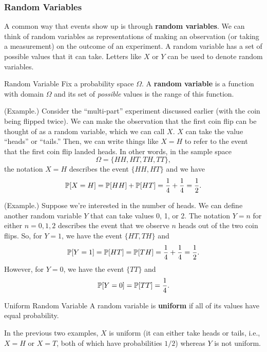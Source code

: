\documentclass[letterpaper]{article}
\newcommand{\0}{\mathbf{0}}
\begin{document}
\subsubsection{Random Variables}
A common way that events show up is through \textbf{random variables}. We can think of random variables as representations of making an observation (or taking a measurement) on the outcome of an experiment. A random variable has a set of possible values that it can take. Letters like $X$ or $Y$ can be used to denote random variables. 
\begin{definition}{Random Variable}{}
    Fix a probability space $\Omega$. A \textbf{random variable} is a function with domain $\Omega$ and its set of \emph{possible} values is the range of this function. 
\end{definition}

\begin{mdframed}
    (Example.) Consider the ``multi-part'' experiment discussed earlier (with the coin being flipped twice). We can make the observation that the first coin flip can be thought of as a random variable, which we can call $X$. $X$ can take the value ``heads'' or ``tails.'' Then, we can write things like $X = H$ to refer to the event that the first coin flip landed heads. In other words, in the sample space \[\Omega = \{HH, HT, TH, TT\},\] the notation $X = H$ describes the event $\{HH, HT\}$ and we have \[\mathbb{P}[X = H] = \mathbb{P}[HH] + \mathbb{P}[HT] = \frac{1}{4} + \frac{1}{4} = \frac{1}{2}.\]
\end{mdframed}

\begin{mdframed}
    (Example.) Suppose we're interested in the number of heads. We can define another random variable $Y$ that can take values 0, 1, or 2. The notation $Y = n$ for either $n = 0, 1, 2$ describes the event that we observe $n$ heads out of the two coin flips. So, for $Y = 1$, we have the event $\{HT, TH\}$ and \[\mathbb{P}[Y = 1] = \mathbb{P}[HT] = \mathbb{P}[TH] = \frac{1}{4} + \frac{1}{4} = \frac{1}{2}.\]
    However, for $Y = 0$, we have the event $\{TT\}$ and \[\mathbb{P}[Y = 0] = \mathbb{P}[TT] = \frac{1}{4}.\]
\end{mdframed}

\begin{definition}{Uniform Random Variable}{}
    A random variable is \textbf{uniform} if all of its values have equal probability.
\end{definition}
In the previous two examples, $X$ is uniform (it can either take heads or tails, i.e., $X = H$ or $X = T$, both of which have probabilities $1/2$) whereas $Y$ is not uniform.
\end{document}
